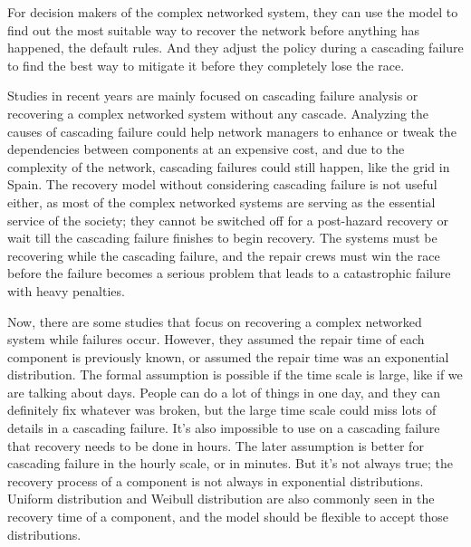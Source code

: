 \documentclass[runningheads]{llncs}
\begin{document}
For decision makers of the complex networked system, they can use the model to find out the most suitable way to recover the network before anything has happened, the default rules. And they adjust the policy during a cascading failure to find the best way to mitigate it before they completely lose the race.



Studies in recent years are mainly focused on cascading failure analysis or recovering a complex networked system without any cascade. 
Analyzing the causes of cascading failure could help network managers to enhance or tweak the dependencies between components at an expensive cost, and due to the complexity of the network, cascading failures could still happen, like the grid in Spain. 
The recovery model without considering cascading failure is not useful either, as most of the complex networked systems are serving as the essential service of the society; they cannot be switched off for a post-hazard recovery or wait till the cascading failure finishes to begin recovery. The systems must be recovering while the cascading failure, and the repair crews must win the race before the failure becomes a serious problem that leads to a catastrophic failure with heavy penalties. 

Now, there are some studies that focus on recovering a complex networked system while failures occur. However, they assumed the repair time of each component is previously known, or assumed the repair time was an exponential distribution. The formal assumption is possible if the time scale is large, like if we are talking about days. People can do a lot of things in one day, and they can definitely fix whatever was broken, but the large time scale could miss lots of details in a cascading failure. It's also impossible to use on a cascading failure that recovery needs to be done in hours. The later assumption is better for cascading failure in the hourly scale, or in minutes. But it's not always true; the recovery process of a component is not always in exponential distributions. Uniform distribution and Weibull distribution are also commonly seen in the recovery time of a component, and the model should be flexible to accept those distributions. %
\end{document}
